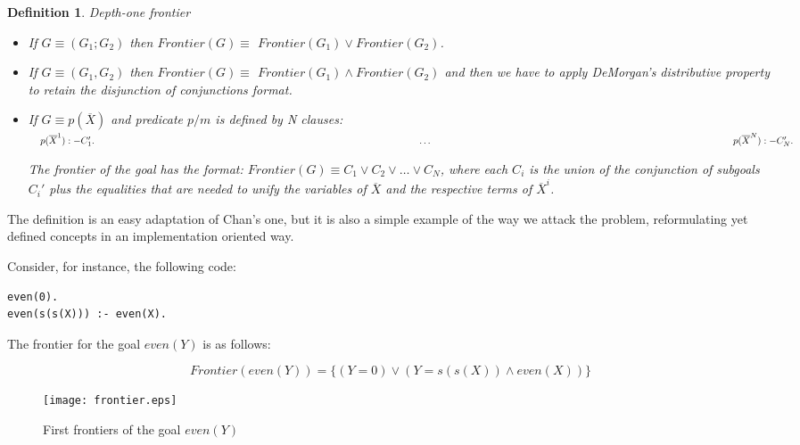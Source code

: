 \documentclass{tlp}
\newtheorem{definition}{Definition} %
\begin{document}
\begin{definition}{\em Depth-one frontier}

    \begin{itemize} 

\item If $G \equiv (G_1;G_2) $ then $Frontier(G) \equiv$
$Frontier(G_1) \vee Frontier(G_2)$.

\item If $G \equiv (G_1,G_2) $ then $Frontier(G) \equiv$
  $Frontier(G_1) \wedge Frontier(G_2)$ and then we have to apply
  DeMorgan's distributive property to retain the disjunction
  of conjunctions format.
  
\item If $G \equiv p( \overline{X}) $ and 
  predicate $p/m$ is defined by N clauses: $~~~p( \overline{X}^1):- C_1'. \\
~~~~~~~~~~~~~~~~~~~~~~~~~~~~~~~~~~~~~~~~~~~~~~~~~~~~~~~~~~~~~~~~~~~~~~~~~~~~~~~~~~~~~~~~~~~~~~~~~~~~~~\ldots \\
~~~~~~~~~~~~~~~~~~~~~~~~~~~~~~~~~~~~~~~~~~~~~~~~~~~~~~~~~~~~~~~~~~~~~~~~~~~~~~~~~~~~~~~~~~~~~~~p( \overline{X}^N):- C_N'. \\
$

The frontier of the goal has the format: $Frontier(G) \equiv C_1
\vee C_2 \vee \ldots \vee C_N$, where each $C_i$ is the union of the
conjunction of subgoals $C_i'$ plus the equalities that are needed to
unify the variables of $\overline{X}$ and the respective terms of
$\overline{X}^i$.

    \end{itemize}

\end{definition}

The definition is an easy adaptation of Chan's one, but it is also a
simple example of the way we attack the problem, reformulating yet
defined concepts in an implementation oriented way.

\noindent
Consider, for instance, the following code:
{\small
\begin{verbatim}
even(0).
even(s(s(X))) :- even(X).
\end{verbatim}
}
The frontier for the goal $even (Y)$ is as follows:

\[Frontier(even(Y)) = \{ ( Y=0 ) \vee ( Y=s(s(X)) \wedge even(X) ) \} \] 

  \begin{figure}
        \centering
        \texttt{[image: frontier.eps]} 
        \caption{First frontiers of the goal $even(Y)$}
        \label{fig:frontier}
  \end{figure}
\end{document}
